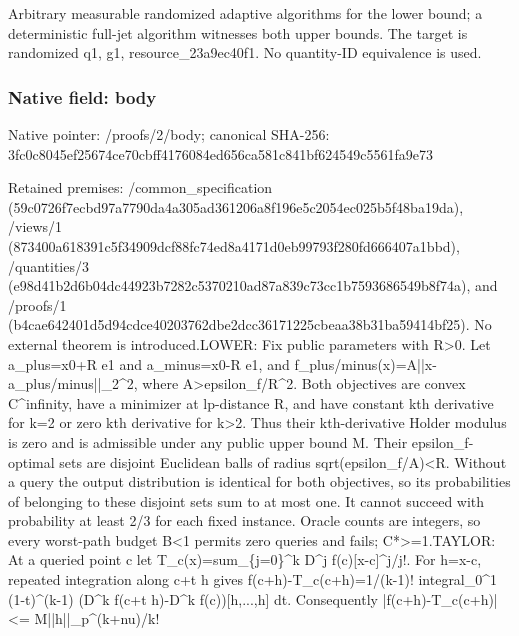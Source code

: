\documentclass[10pt,a4paper]{article}
\begin{document}
\begingroup\raggedright\sloppy Arbitrary measurable randomized adaptive algorithms for the lower bound;\allowbreak{} a deterministic full-jet algorithm witnesses both upper bounds. The target is randomized q1,\allowbreak{} g1,\allowbreak{} resource\_\allowbreak{}23a9ec40f1. No quantity-ID equivalence is used.\par\endgroup

\subsubsection{Native field: body}
Native pointer: /proofs/2/body; canonical SHA-256: 3fc0c8045ef25674ce70cbff4176084ed656ca581c841bf624549c5561fa9e73

\begingroup\raggedright\sloppy Retained premises:\allowbreak{} /\allowbreak{}common\_\allowbreak{}specification (59c0726f7ecbd97a7790da4a305ad361206a8f196e5c2054ec025b5f48ba19da),\allowbreak{} /\allowbreak{}views/\allowbreak{}1 (873400a618391c5f34909dcf88fc74ed8a4171d0eb99793f280fd666407a1bbd),\allowbreak{} /\allowbreak{}quantities/\allowbreak{}3 (e98d41b2d6b04dc44923b7282c5370210ad87a839c73cc1b7593686549b8f74a),\allowbreak{} and /\allowbreak{}proofs/\allowbreak{}1 (b4cae642401d5d94cdce40203762dbe2dcc36171225cbeaa38b31ba59414bf25). No external theorem is introduced.\newline{}LOWER:\allowbreak{} Fix public parameters with R>0. Let a\_\allowbreak{}plus=\allowbreak{}x0+R e1 and a\_\allowbreak{}minus=\allowbreak{}x0-R e1,\allowbreak{} and f\_\allowbreak{}plus/\allowbreak{}minus(x)=\allowbreak{}A||x-a\_\allowbreak{}plus/\allowbreak{}minus||\_\allowbreak{}2\textasciicircum{}2,\allowbreak{} where A>epsilon\_\allowbreak{}f/\allowbreak{}R\textasciicircum{}2. Both objectives are convex C\textasciicircum{}infinity,\allowbreak{} have a minimizer at lp-distance R,\allowbreak{} and have constant kth derivative for k=\allowbreak{}2 or zero kth derivative for k>2. Thus their kth-derivative Holder modulus is zero and is admissible under any public upper bound M. Their epsilon\_\allowbreak{}f-optimal sets are disjoint Euclidean balls of radius sqrt(epsilon\_\allowbreak{}f/\allowbreak{}A)<R. Without a query the output distribution is identical for both objectives,\allowbreak{} so its probabilities of belonging to these disjoint sets sum to at most one. It cannot succeed with probability at least 2/\allowbreak{}3 for each fixed instance. Oracle counts are integers,\allowbreak{} so every worst-path budget B<1 permits zero queries and fails;\allowbreak{} C*>=\allowbreak{}1.\newline{}TAYLOR:\allowbreak{} At a queried point c let T\_\allowbreak{}c(x)=\allowbreak{}sum\_\allowbreak{}\{j=\allowbreak{}0\}\textasciicircum{}k D\textasciicircum{}j f(c)[x-c]\textasciicircum{}j/\allowbreak{}j!. For h=\allowbreak{}x-c,\allowbreak{} repeated integration along c+t h gives f(c+h)-T\_\allowbreak{}c(c+h)=\allowbreak{}1/\allowbreak{}(k-1)! integral\_\allowbreak{}0\textasciicircum{}1 (1-t)\textasciicircum{}(k-1) (D\textasciicircum{}k f(c+t h)-D\textasciicircum{}k f(c))[h,\allowbreak{}...,\allowbreak{}h] dt. Consequently |f(c+h)-T\_\allowbreak{}c(c+h)| <=\allowbreak{} M||h||\_\allowbreak{}p\textasciicircum{}(k+nu)/\allowbreak{}k! 
\end{document}
